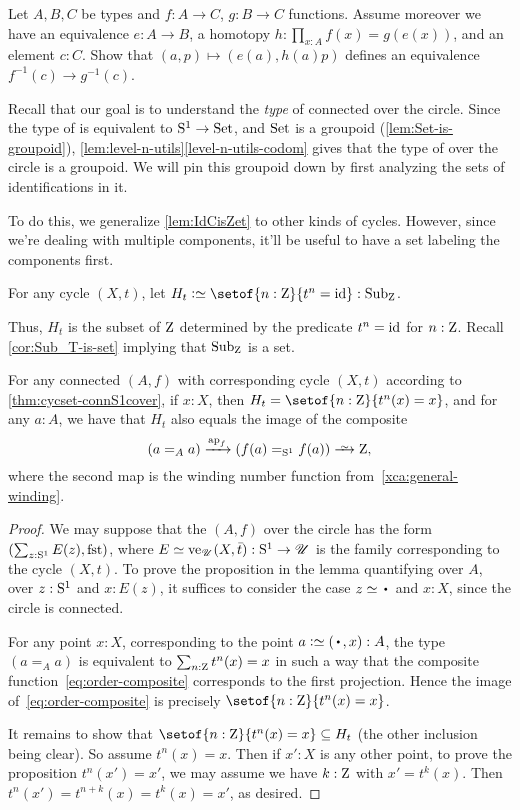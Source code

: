 \begin{xca}\label{xca:preim-eq}
Let $A,B,C$ be types and $f:A\to C$, $g:B\to C$ functions. Assume moreover
we have an equivalence $e: A\to B$, a homotopy  $h: \prod_{x:A} f(x)=g(e(x))$,
and an element $c:C$.
Show that $(a,p)\mapsto (e(a),h(a)p)$ defines an equivalence $f^{-1}(c)\to g^{-1}(c)$.
\end{xca}

Recall that our goal is to understand the \emph{type} of connected
\coverings over the circle. Since the type of \coverings is
equivalent to ${\mathrm{S}^1}\to \mathrm{Set}$, and $\mathrm{Set}$ is a groupoid
(\cref{lem:Set-is-groupoid}),
\cref{lem:level-n-utils}\ref{level-n-utils-codom} gives
that the type of \coverings over the circle is a groupoid.
We will pin this groupoid down by first analyzing the sets of
identifications in it.

To do this, we generalize \cref{lem:IdCisZet} to other kinds of cycles.
However, since we're dealing with multiple components,
it'll be useful to have a set labeling the components first.
\begin{definition}\label{def:subgroup-zet-of-cycle}
  For any cycle $(X,t)$,
  let $H_t \defeq \setof{n:\zet}{t^n=\id} : \Sub_\zet$.
\end{definition}
Thus, $H_t$ is the subset of $\mathrm{Z}$ determined by the predicate $t^n=\mathord{\mathrm{id}}$
for $n:\mathrm{Z}$. 
Recall \cref{cor:Sub_T-is-set} implying that $\Sub_\zet$ is a set.
\begin{lemma}\label{lem:cycle-order-point-ap}
  For any connected \covering $(A,f)$ with corresponding cycle $(X,t)$
  according to \cref{thm:cycset-connS1cover},
  if $x:X$, then $H_t = \setof{n:\zet}{t^n(x)=x}$,
  and for any $a:A$, we have that $H_t$
  also equals the image of the composite
  \begin{equation}\label{eq:order-composite}
    (a =_A a) \xrightarrow{\ap{f}}{} (f(a) =_\Sc f(a)) \we \zet,
  \end{equation}
  where the second map is the winding number function
  from~\cref{xca:general-winding}.
\end{lemma}
\begin{proof}
  We may suppose that the \covering $(A,f)$ over the circle
  has the form $(\sum_{z:\Sc} E(z),\fst)$, where
  $E\jdeq\ve_\UU(X,\etop{t}) : \Sc\to\UU$ is the family corresponding
  to the cycle $(X,t)$.
  To prove the proposition in the lemma quantifying over $A$, \ie
  over $z:{\mathrm{S}^1}$ and $x:E(z)$, it suffices to consider the case
  $z\jdeq\base$ and $x:X$, since the circle is connected.

  For any point $x:X$, corresponding to the point $a\defeq(\base,x):A$,
  the type $(a =_A a)$ is equivalent to $\sum_{n:\mathrm{Z}}t^n(x)=x$
  in such a way that the composite function~\eqref{eq:order-composite}
  corresponds to the first projection.
  Hence the image of~\eqref{eq:order-composite} is precisely
  $\setof{n:\zet}{t^n(x)=x}$.

  It remains to show that $\setof{n:\zet}{t^n(x)=x} \subseteq H_t$
  (the other inclusion being clear).
  So assume $t^n(x)=x$.
  Then if $x':X$ is any other point, to prove the proposition
  $t^n(x')=x'$, we may assume we have $k:\mathrm{Z}$ with $x'=t^k(x)$. Then
  $t^n(x')=t^{n+k}(x)=t^k(x)=x'$, as desired.
\end{proof}

